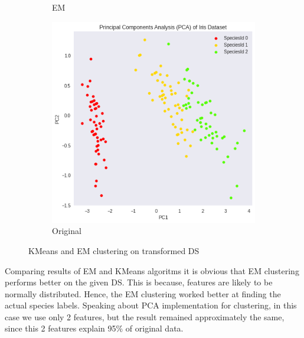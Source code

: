 \documentclass{homework}
\begin{document}
\begin{figure}[hbt!]
\begin{subfigure}[b]{0.3\textwidth}
         \caption{EM}
     \end{subfigure}
     \hfill
     \begin{subfigure}[b]{0.3\textwidth}
         \centering
         \includegraphics[width=\textwidth]{original_DS.png}
         \caption{Original}
     \end{subfigure}
        \caption{KMeans and EM clustering on transformed DS}
\end{figure}

Comparing results of EM and KMeans algoritms it is obvious that EM clustering performs better on the given DS. This is because, features are likely to be normally distributed. Hence, the EM clustering worked better at finding the actual species labels. Speaking about PCA implementation for clustering, in this case we use only 2 features, but the result remained approximately the same, since this 2 features explain 95\% of original data.
\end{document}
